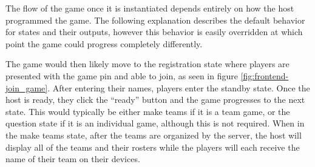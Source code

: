 \documentclass{article}
\begin{document}
            The flow of the game once it is instantiated depends entirely on how the host programmed the game. The following explanation describes the default behavior for states and their outputs, however this behavior is easily overridden at which point the game could progress completely differently.
            \smallskip
            
            The game would then likely move to the registration state where players are presented with the game pin and able to join, as seen in figure \ref{fig:frontend-join_game}. After entering their names, players enter the standby state. Once the host is ready, they click the ``ready'' button and the game progresses to the next state. This would typically be either make teams if it is a team game, or the question state if it is an individual game, although this is not required. When in the make teams state, after the teams are organized by the server, the host will display all of the teams and their rosters while the players will each receive the name of their team on their devices. 
\end{document}
